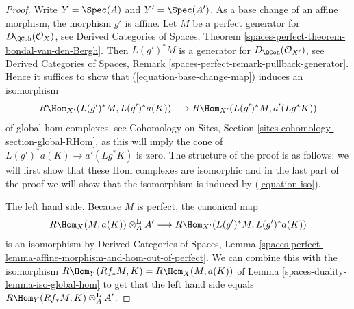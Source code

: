 \begin{proof}
Write $Y = \Spec(A)$ and $Y' = \Spec(A')$. As a base change of an affine
morphism, the morphism $g'$ is affine. Let $M$ be a perfect generator
for $D_\QCoh(\mathcal{O}_X)$, see Derived Categories of Spaces, Theorem
\ref{spaces-perfect-theorem-bondal-van-den-Bergh}. Then $L(g')^*M$ is a
generator for $D_\QCoh(\mathcal{O}_{X'})$, see
Derived Categories of Spaces, Remark
\ref{spaces-perfect-remark-pullback-generator}.
Hence it suffices to show that (\ref{equation-base-change-map})
induces an isomorphism
\begin{equation}
\label{equation-iso}
R\Hom_{X'}(L(g')^*M, L(g')^*a(K))
\longrightarrow
R\Hom_{X'}(L(g')^*M, a'(Lg^*K))
\end{equation}
of global hom complexes, see
Cohomology on Sites, Section \ref{sites-cohomology-section-global-RHom},
as this will imply the cone of $L(g')^*a(K) \to a'(Lg^*K)$
is zero.
The structure of the proof is as follows: we will first show that
these Hom complexes are isomorphic and in the last part of the proof
we will show that the isomorphism is induced by (\ref{equation-iso}).

\medskip\noindent
The left hand side. Because $M$ is perfect, the canonical map
$$
R\Hom_X(M, a(K)) \otimes^\mathbf{L}_A A'
\longrightarrow
R\Hom_{X'}(L(g')^*M, L(g')^*a(K))
$$
is an isomorphism by Derived Categories of Spaces, Lemma
\ref{spaces-perfect-lemma-affine-morphism-and-hom-out-of-perfect}.
We can combine this with the isomorphism
$R\Hom_Y(Rf_*M, K) = R\Hom_X(M, a(K))$
of Lemma \ref{spaces-duality-lemma-iso-global-hom}
to get that the left hand side equals
$R\Hom_Y(Rf_*M, K) \otimes^\mathbf{L}_A A'$.


\end{proof}
